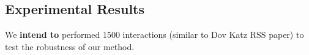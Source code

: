 \subsection{Experimental Results}
We {\bf intend to} performed 1500 interactions (similar to Dov Katz RSS paper) to test the robustness of our method.
% 
% 
% 
